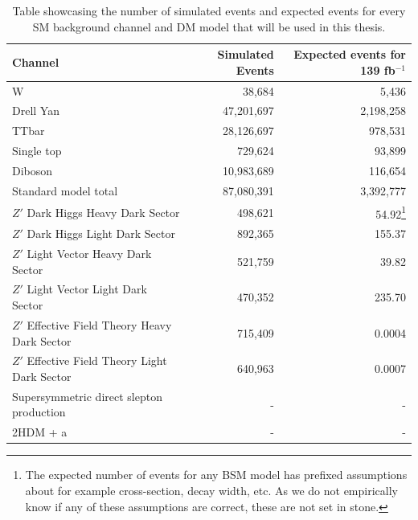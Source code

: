 \documentclass[12pt, a4paper]{book}
\begin{document}
\begin{table}[!h]
   \centering
    \caption[Dataset used for ML]{Table showcasing the number of simulated events and expected events for every SM background channel and DM model that will be used in this thesis.}
    \footnotesize\begin{tabular}{l|r|r}\midrule\midrule
      Channel                                                                         & Simulated Events            & Expected events for 139 fb$^{-1}$ \\\midrule
      W                                                                               & 38,684                & 5,436        \\
      Drell Yan                                                                       & 47,201,697            & 2,198,258    \\
      TTbar                                                                           & 28,126,697            & 978,531      \\
      Single top                                                                      & 729,624               & 93,899       \\
      Diboson                                                                         & 10,983,689            & 116,654      \\\midrule
      Standard model total                                                            & 87,080,391            & 3,392,777    \\\midrule
      $Z'$ Dark Higgs Heavy Dark Sector                                               & 498,621               & 54.92\footnote{The expected number of events for any BSM model has prefixed assumptions about for example cross-section, decay width, etc. As we do not empirically know if any of these assumptions are correct, these are not set in stone.}         \\
      $Z'$ Dark Higgs Light Dark Sector                                               & 892,365               & 155.37         \\
      $Z'$ Light Vector Heavy Dark Sector                                             & 521,759               & 39.82         \\
      $Z'$ Light Vector Light Dark Sector                                             & 470,352               & 235.70         \\
      $Z'$ Effective Field Theory Heavy Dark Sector                                   & 715,409               & 0.0004           \\
      $Z'$ Effective Field Theory Light Dark Sector                                   & 640,963               & 0.0007          \\
      Supersymmetric direct slepton production                                        & -               & -          \\
      2HDM + a                                                                        & -               & -          \\\midrule\midrule
   \end{tabular}
   \label{tab:dataset}
\end{table}
\end{document}
